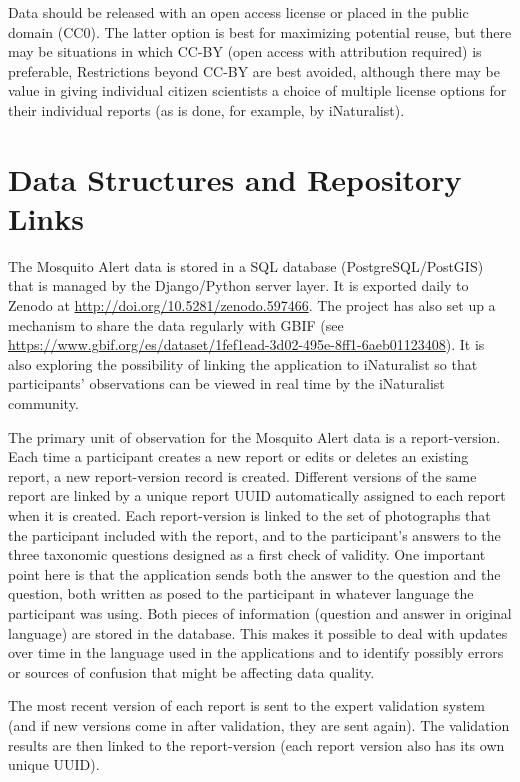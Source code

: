 \documentclass[]{article}
\begin{document}
Data should be released with an open access license or placed in the public domain (CC0). The latter option is best for maximizing potential reuse, but there may be situations in which CC-BY (open access with attribution required) is preferable, Restrictions beyond CC-BY are best avoided, although there may be value in giving individual citizen scientists a choice of multiple license options for their individual reports (as is done, for example, by iNaturalist).

\hypertarget{data-structures-and-repository-links}{%
\section{Data Structures and Repository Links}\label{data-structures-and-repository-links}}

The Mosquito Alert data is stored in a SQL database (PostgreSQL/PostGIS) that is managed by the Django/Python server layer. It is exported daily to Zenodo at \url{http://doi.org/10.5281/zenodo.597466}. The project has also set up a mechanism to share the data regularly with GBIF (see \url{https://www.gbif.org/es/dataset/1fef1ead-3d02-495e-8ff1-6aeb01123408}). It is also exploring the possibility of linking the application to iNaturalist so that participants' observations can be viewed in real time by the iNaturalist community.

The primary unit of observation for the Mosquito Alert data is a report-version. Each time a participant creates a new report or edits or deletes an existing report, a new report-version record is created. Different versions of the same report are linked by a unique report UUID automatically assigned to each report when it is created.
Each report-version is linked to the set of photographs that the participant included with the report, and to the participant's answers to the three taxonomic questions designed as a first check of validity. One important point here is that the application sends both the answer to the question and the question, both written as posed to the participant in whatever language the participant was using. Both pieces of information (question and answer in original language) are stored in the database. This makes it possible to deal with updates over time in the language used in the applications and to identify possibly errors or sources of confusion that might be affecting data quality.

The most recent version of each report is sent to the expert validation system (and if new versions come in after validation, they are sent again). The validation results are then linked to the report-version (each report version also has its own unique UUID).
\end{document}
